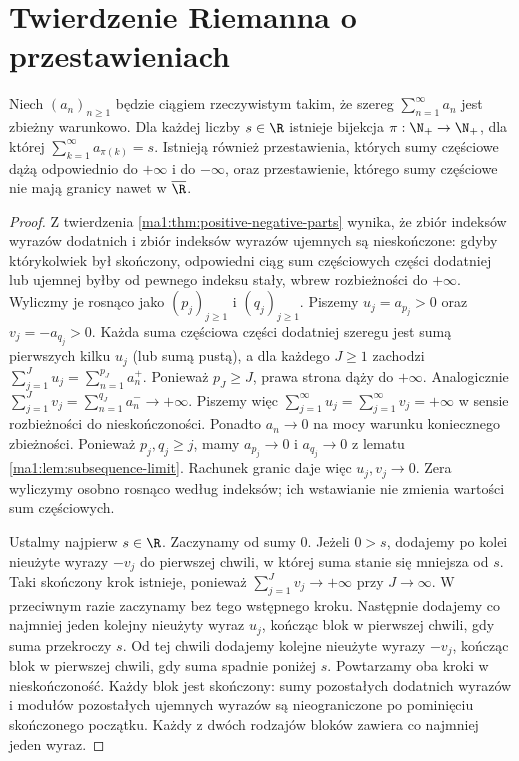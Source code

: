 \section{Twierdzenie Riemanna o przestawieniach}
\begin{twierdzenie}[Riemanna]
\label{ma1:thm:riemann-rearrangement}
Niech $(a_n)_{n\ge1}$ będzie ciągiem rzeczywistym takim, że szereg $\sum_{n=1}^\infty a_n$ jest zbieżny warunkowo. Dla każdej liczby $s\in\R$ istnieje bijekcja $\pi:\N_+\to\N_+$, dla której $\sum_{k=1}^\infty a_{\pi(k)}=s$. Istnieją również przestawienia, których sumy częściowe dążą odpowiednio do $+\infty$ i do $-\infty$, oraz przestawienie, którego sumy częściowe nie mają granicy nawet w $\overline{\R}$.
\end{twierdzenie}
\begin{proof}
Z twierdzenia \ref{ma1:thm:positive-negative-parts} wynika, że zbiór indeksów wyrazów dodatnich i zbiór indeksów wyrazów ujemnych są nieskończone: gdyby którykolwiek był skończony, odpowiedni ciąg sum częściowych części dodatniej lub ujemnej byłby od pewnego indeksu stały, wbrew rozbieżności do $+\infty$. Wyliczmy je rosnąco jako $(p_j)_{j\ge1}$ i $(q_j)_{j\ge1}$. Piszemy $u_j=a_{p_j}>0$ oraz $v_j=-a_{q_j}>0$. Każda suma częściowa części dodatniej szeregu jest sumą pierwszych kilku $u_j$ (lub sumą pustą), a dla każdego $J\ge1$ zachodzi $\sum_{j=1}^J u_j=\sum_{n=1}^{p_J}a_n^+$. Ponieważ $p_J\ge J$, prawa strona dąży do $+\infty$. Analogicznie $\sum_{j=1}^J v_j=\sum_{n=1}^{q_J}a_n^-\to+\infty$. Piszemy więc $\sum_{j=1}^\infty u_j=\sum_{j=1}^\infty v_j=+\infty$ w sensie rozbieżności do nieskończoności. Ponadto $a_n\to0$ na mocy warunku koniecznego zbieżności. Ponieważ $p_j,q_j\ge j$, mamy $a_{p_j}\to0$ i $a_{q_j}\to0$ z lematu \ref{ma1:lem:subsequence-limit}. Rachunek granic daje więc $u_j,v_j\to0$. Zera wyliczymy osobno rosnąco według indeksów; ich wstawianie nie zmienia wartości sum częściowych.

Ustalmy najpierw $s\in\R$. Zaczynamy od sumy $0$. Jeżeli $0>s$, dodajemy po kolei nieużyte wyrazy $-v_j$ do pierwszej chwili, w której suma stanie się mniejsza od $s$. Taki skończony krok istnieje, ponieważ $\sum_{j=1}^J v_j\to+\infty$ przy $J\to\infty$. W przeciwnym razie zaczynamy bez tego wstępnego kroku. Następnie dodajemy co najmniej jeden kolejny nieużyty wyraz $u_j$, kończąc blok w pierwszej chwili, gdy suma przekroczy $s$. Od tej chwili dodajemy kolejne nieużyte wyrazy $-v_j$, kończąc blok w pierwszej chwili, gdy suma spadnie poniżej $s$. Powtarzamy oba kroki w nieskończoność. Każdy blok jest skończony: sumy pozostałych dodatnich wyrazów i modułów pozostałych ujemnych wyrazów są nieograniczone po pominięciu skończonego początku. Każdy z dwóch rodzajów bloków zawiera co najmniej jeden wyraz.


\end{proof}
